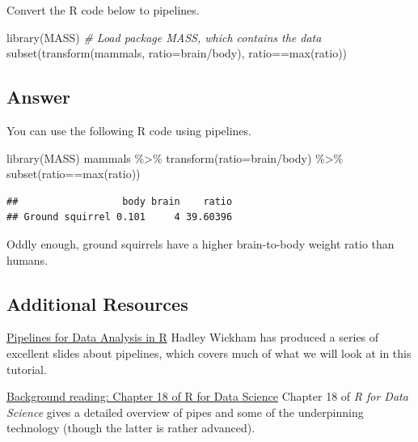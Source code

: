 \documentclass[
]{book}
\newenvironment{Shaded}{\begin{snugshade}}{\end{snugshade}}
\newcommand{\AttributeTok}[1]{\textcolor[rgb]{0.77,0.63,0.00}{#1}}
\newcommand{\CommentTok}[1]{\textcolor[rgb]{0.56,0.35,0.01}{\textit{#1}}}
\newcommand{\FunctionTok}[1]{\textcolor[rgb]{0.00,0.00,0.00}{#1}}
\newcommand{\NormalTok}[1]{#1}
\newcommand{\SpecialCharTok}[1]{\textcolor[rgb]{0.00,0.00,0.00}{#1}}
\begin{document}
Convert the R code below to pipelines.

\begin{Shaded}
\begin{Highlighting}[]
\FunctionTok{library}\NormalTok{(MASS)                       }\CommentTok{\# Load package MASS, which contains the data}
\FunctionTok{subset}\NormalTok{(}\FunctionTok{transform}\NormalTok{(mammals, }\AttributeTok{ratio=}\NormalTok{brain}\SpecialCharTok{/}\NormalTok{body), ratio}\SpecialCharTok{==}\FunctionTok{max}\NormalTok{(ratio))}
\end{Highlighting}
\end{Shaded}

\hypertarget{answer}{%
\subsection{Answer}\label{answer}}

You can use the following R code using pipelines.

\begin{Shaded}
\begin{Highlighting}[]
\FunctionTok{library}\NormalTok{(MASS)}
\NormalTok{mammals }\SpecialCharTok{\%\textgreater{}\%}
  \FunctionTok{transform}\NormalTok{(}\AttributeTok{ratio=}\NormalTok{brain}\SpecialCharTok{/}\NormalTok{body) }\SpecialCharTok{\%\textgreater{}\%}
  \FunctionTok{subset}\NormalTok{(ratio}\SpecialCharTok{==}\FunctionTok{max}\NormalTok{(ratio))}
\end{Highlighting}
\end{Shaded}

\begin{verbatim}
##                  body brain    ratio
## Ground squirrel 0.101     4 39.60396
\end{verbatim}

Oddly enough, ground squirrels have a higher brain-to-body weight ratio than humans.

\hypertarget{additional-resources}{%
\subsection{Additional Resources}\label{additional-resources}}

\href{\%22https://speakerdeck.com/hadley/pipelines-for-data-analysis-in-r\%22}{Pipelines for Data Analysis in R}
Hadley Wickham has produced a series of excellent slides about pipelines, which covers much of what we will look at in this tutorial.

\href{\%22http://r4ds.had.co.nz/pipes.html\%22}{Background reading: Chapter 18 of R for Data Science}
Chapter 18 of \emph{R for Data Science} gives a detailed overview of pipes and some of the underpinning technology (though the latter is rather advanced).
\end{document}

